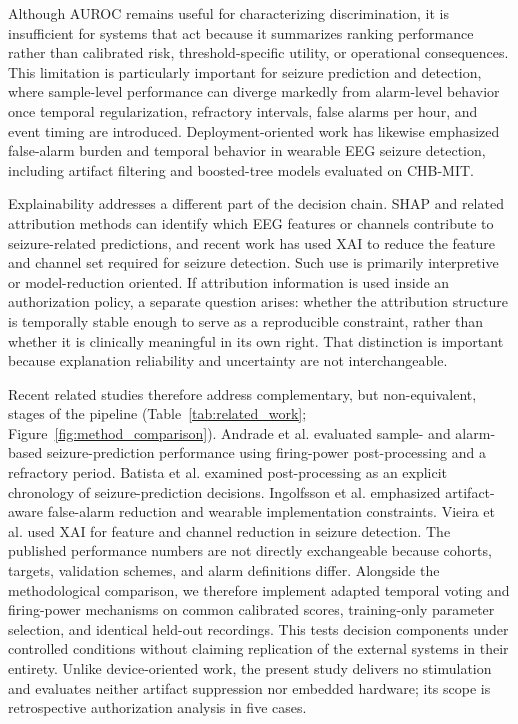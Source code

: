 \documentclass[11pt,a4paper]{article}
\begin{document}
Although AUROC remains useful for characterizing discrimination, it is insufficient for systems that act because it summarizes ranking performance rather than calibrated risk, threshold-specific utility, or operational consequences\citep{dehond2022auroc,vancalster2025performance}. This limitation is particularly important for seizure prediction and detection, where sample-level performance can diverge markedly from alarm-level behavior once temporal regularization, refractory intervals, false alarms per hour, and event timing are introduced\citep{andrade2024samplealarm,batista2024postprocessing}. Deployment-oriented work has likewise emphasized false-alarm burden and temporal behavior in wearable EEG seizure detection, including artifact filtering and boosted-tree models evaluated on CHB-MIT\citep{ingolfsson2024artifact}.

Explainability addresses a different part of the decision chain. SHAP and related attribution methods can identify which EEG features or channels contribute to seizure-related predictions, and recent work has used XAI to reduce the feature and channel set required for seizure detection\citep{vieira2023xai}. Such use is primarily interpretive or model-reduction oriented. If attribution information is used inside an authorization policy, a separate question arises: whether the attribution structure is temporally stable enough to serve as a reproducible constraint, rather than whether it is clinically meaningful in its own right. That distinction is important because explanation reliability and uncertainty are not interchangeable\citep{salvi2025uncertainty}.

Recent related studies therefore address complementary, but non-equivalent, stages of the pipeline (Table~\ref{tab:related_work}; Figure~\ref{fig:method_comparison}). Andrade et al. evaluated sample- and alarm-based seizure-prediction performance using firing-power post-processing and a refractory period\citep{andrade2024samplealarm}. Batista et al. examined post-processing as an explicit chronology of seizure-prediction decisions\citep{batista2024postprocessing}. Ingolfsson et al. emphasized artifact-aware false-alarm reduction and wearable implementation constraints\citep{ingolfsson2024artifact}. Vieira et al. used XAI for feature and channel reduction in seizure detection\citep{vieira2023xai}. The published performance numbers are not directly exchangeable because cohorts, targets, validation schemes, and alarm definitions differ. Alongside the methodological comparison, we therefore implement adapted temporal voting and firing-power mechanisms on common calibrated scores, training-only parameter selection, and identical held-out recordings. This tests decision components under controlled conditions without claiming replication of the external systems in their entirety. Unlike device-oriented work, the present study delivers no stimulation and evaluates neither artifact suppression nor embedded hardware; its scope is retrospective authorization analysis in five cases.
\end{document}
